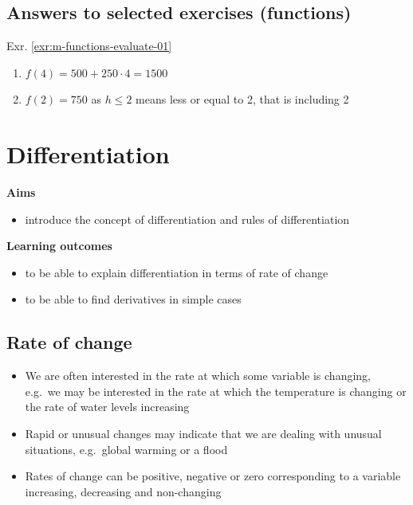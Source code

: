 \documentclass[
]{book}
\providecommand{\tightlist}{%
  \setlength{\itemsep}{0pt}\setlength{\parskip}{0pt}}
\theoremstyle{definition}
\theoremstyle{definition}
\theoremstyle{definition}
\theoremstyle{remark}
\begin{document}
\hypertarget{answers-to-selected-exercises-functions}{%
\section*{Answers to selected exercises (functions)}\label{answers-to-selected-exercises-functions}}

Exr. \ref{exr:m-functions-evaluate-01}

\begin{enumerate}
\def\labelenumi{\alph{enumi})}
\tightlist
\item
  \(f(4) = 500 + 250 \cdot 4 = 1500\)
\item
  \(f(2) = 750\) as \(h \le 2\) means less or equal to 2, that is including 2
\end{enumerate}

\hypertarget{differentiation}{%
\chapter{Differentiation}\label{differentiation}}

\textbf{Aims}

\begin{itemize}
\tightlist
\item
  introduce the concept of differentiation and rules of differentiation
\end{itemize}

\textbf{Learning outcomes}

\begin{itemize}
\tightlist
\item
  to be able to explain differentiation in terms of rate of change
\item
  to be able to find derivatives in simple cases
\end{itemize}

\hypertarget{rate-of-change}{%
\section{Rate of change}\label{rate-of-change}}

\begin{itemize}
\tightlist
\item
  We are often interested in the rate at which some variable is changing, e.g.~we may be interested in the rate at which the temperature is changing or the rate of water levels increasing
\item
  Rapid or unusual changes may indicate that we are dealing with unusual situations, e.g.~global warming or a flood
\item
  Rates of change can be positive, negative or zero corresponding to a variable increasing, decreasing and non-changing
\end{itemize}
\end{document}
